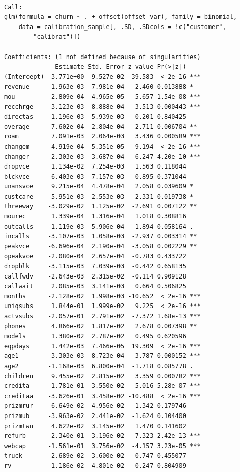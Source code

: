 \documentclass[
]{article}
\begin{document}
\begin{verbatim}

Call:
glm(formula = churn ~ . + offset(offset_var), family = binomial, 
    data = calibration_sample[, .SD, .SDcols = !c("customer", 
        "calibrat")])

Coefficients: (1 not defined because of singularities)
              Estimate Std. Error z value Pr(>|z|)    
(Intercept) -3.771e+00  9.527e-02 -39.583  < 2e-16 ***
revenue      1.963e-03  7.981e-04   2.460 0.013888 *  
mou         -2.809e-04  4.965e-05  -5.657 1.54e-08 ***
recchrge    -3.123e-03  8.888e-04  -3.513 0.000443 ***
directas    -1.196e-03  5.939e-03  -0.201 0.840425    
overage      7.602e-04  2.804e-04   2.711 0.006704 ** 
roam         7.091e-03  2.064e-03   3.436 0.000589 ***
changem     -4.919e-04  5.351e-05  -9.194  < 2e-16 ***
changer      2.303e-03  3.687e-04   6.247 4.20e-10 ***
dropvce      1.134e-02  7.254e-03   1.563 0.118044    
blckvce      6.403e-03  7.157e-03   0.895 0.371044    
unansvce     9.215e-04  4.478e-04   2.058 0.039609 *  
custcare    -5.951e-03  2.553e-03  -2.331 0.019738 *  
threeway    -3.029e-02  1.125e-02  -2.691 0.007122 ** 
mourec       1.339e-04  1.316e-04   1.018 0.308816    
outcalls     1.119e-03  5.906e-04   1.894 0.058164 .  
incalls     -3.107e-03  1.058e-03  -2.937 0.003314 ** 
peakvce     -6.696e-04  2.190e-04  -3.058 0.002229 ** 
opeakvce    -2.080e-04  2.657e-04  -0.783 0.433722    
dropblk     -3.115e-03  7.039e-03  -0.442 0.658135    
callfwdv    -2.643e-03  2.315e-02  -0.114 0.909128    
callwait     2.085e-03  3.141e-03   0.664 0.506825    
months      -2.128e-02  1.998e-03 -10.652  < 2e-16 ***
uniqsubs     1.844e-01  1.999e-02   9.225  < 2e-16 ***
actvsubs    -2.057e-01  2.791e-02  -7.372 1.68e-13 ***
phones       4.866e-02  1.817e-02   2.678 0.007398 ** 
models       1.380e-02  2.787e-02   0.495 0.620596    
eqpdays      1.442e-03  7.466e-05  19.309  < 2e-16 ***
age1        -3.303e-03  8.723e-04  -3.787 0.000152 ***
age2        -1.168e-03  6.800e-04  -1.718 0.085778 .  
children     9.455e-02  2.815e-02   3.359 0.000782 ***
credita     -1.781e-01  3.550e-02  -5.016 5.28e-07 ***
creditaa    -3.626e-01  3.458e-02 -10.488  < 2e-16 ***
prizmrur     6.649e-02  4.956e-02   1.342 0.179746    
prizmub     -3.963e-02  2.441e-02  -1.624 0.104400    
prizmtwn     4.622e-02  3.145e-02   1.470 0.141602    
refurb       2.340e-01  3.196e-02   7.323 2.42e-13 ***
webcap      -1.561e-01  3.756e-02  -4.157 3.23e-05 ***
truck        2.689e-02  3.600e-02   0.747 0.455077    
rv           1.186e-02  4.801e-02   0.247 0.804909    

\end{verbatim}
\end{document}
